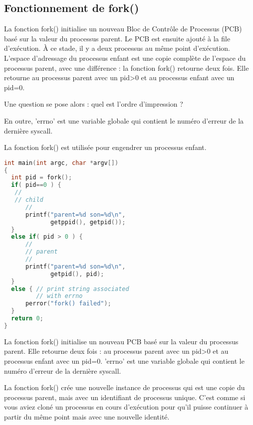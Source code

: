\documentclass[12pt]{report}
\begin{document}
\subsection{Fonctionnement de fork()} 
 La fonction fork() initialise un nouveau Bloc de Contrôle de Processus (PCB) basé sur la valeur du processus parent. Le PCB est ensuite ajouté à la file d'exécution. À ce stade, il y a deux processus au même point d'exécution. L'espace d'adressage du processus enfant est une copie complète de l'espace du processus parent, avec une différence : la fonction fork() retourne deux fois. Elle retourne au processus parent avec un pid>0 et au processus enfant avec un pid=0. 

 Une question se pose alors : quel est l'ordre d'impression ? 

 En outre, 'errno' est une variable globale qui contient le numéro d'erreur de la dernière syscall. 

 La fonction fork() est utilisée pour engendrer un processus enfant.
\begin{lstlisting}[language=C]
int main(int argc, char *argv[])
{
  int pid = fork();
  if( pid==0 ) { 
   //
   // child
      //
      printf("parent=%d son=%d\n",
             getppid(), getpid());
  }
  else if( pid > 0 ) {
      //
      // parent
      //
      printf("parent=%d son=%d\n",
             getpid(), pid);
  }
  else { // print string associated
         // with errno   
      perror("fork() failed"); 
  }
  return 0;
}
\end{lstlisting}
\begin{tcolorbox}[colback=yellow!5, colframe=yellow!80!black, title={\faBookmark À retenir}]
La fonction fork() initialise un nouveau PCB basé sur la valeur du processus parent. Elle retourne deux fois : au processus parent avec un pid>0 et au processus enfant avec un pid=0. 'errno' est une variable globale qui contient le numéro d'erreur de la dernière syscall.
\end{tcolorbox}
\begin{tcolorbox}[colback=green!5, colframe=green!75!black, title={\faLightbulb Intuition}]
La fonction fork() crée une nouvelle instance de processus qui est une copie du processus parent, mais avec un identifiant de processus unique. C'est comme si vous aviez cloné un processus en cours d'exécution pour qu'il puisse continuer à partir du même point mais avec une nouvelle identité.
\end{tcolorbox}
\end{document}
